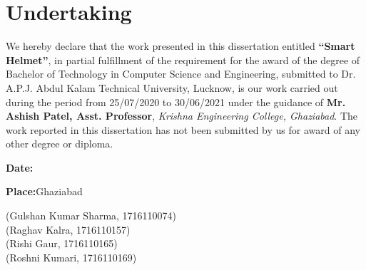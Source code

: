 \chapter*{Undertaking}
We hereby declare that the work presented in this dissertation entitled \textbf{“Smart Helmet”}, in partial
fulfillment of the requirement for the award of the degree of Bachelor of Technology in Computer
Science and Engineering, submitted to Dr. A.P.J. Abdul Kalam Technical University, Lucknow, is our
work carried out during the period from 25/07/2020 to 30/06/2021 under the guidance of \textbf{Mr. Ashish
	Patel, Asst. Professor}, \textit{Krishna Engineering College, Ghaziabad}. The work reported in this
dissertation has not been submitted by us for award of any other degree or diploma.

\vspace{2cm}

\begin{minipage}[right]{.4\linewidth}
	
	\textbf{Date:}
	\vspace{.9cm}
	
	\textbf{Place:}Ghaziabad
	
\end{minipage}
\begin{minipage}[left]{.5\linewidth}
	\begin{center}
		(Gulshan Kumar Sharma, 1716110074)\\
		(Raghav Kalra, 1716110157)\\
		(Rishi Gaur, 1716110165)\\
		(Roshni Kumari, 1716110169)
		
	\end{center}
	
\end{minipage}